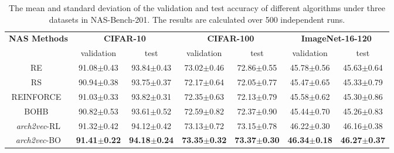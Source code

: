\begin{table}[t]
\begin{adjustbox}{width=\columnwidth,center}
\scriptsize{
\begin{tabular}{|c|c|c|c|c|c|c|}
\hline
\multirow{2}{*}{\textbf{NAS Methods}}  & \multicolumn{2}{c|}{\textbf{CIFAR-10}}                     & \multicolumn{2}{c|}{\textbf{CIFAR-100}}                  & \multicolumn{2}{c|}{\textbf{ImageNet-16-120}}              \\ \cline{2-7} & validation              & test                    & validation             & test                   & validation              & test                    \\ \hline
RE~\cite{real2019regularized}      & 91.08$\pm$0.43          & 93.84$\pm$0.43          & 73.02$\pm$0.46         & 72.86$\pm$0.55         & 45.78$\pm$0.56          & 45.63$\pm$0.64          \\
RS~\cite{bergstra12randsearch}  & 90.94$\pm$0.38          & 93.75$\pm$0.37          & 72.17$\pm$0.64         & 72.05$\pm$0.77         & 45.47$\pm$0.65          & 45.33$\pm$0.79          \\
REINFORCE~\cite{williams92rl}     & 91.03$\pm$0.33          & 93.82$\pm$0.31          & 72.35$\pm$0.63         & 72.13$\pm$0.79         & 45.58$\pm$0.62          & 45.30$\pm$0.86          \\
BOHB~\cite{falkner-icml-18}      & 90.82$\pm$0.53          & 93.61$\pm$0.52          & 72.59$\pm$0.82         & 72.37$\pm$0.90         & 45.44$\pm$0.70          & 45.26$\pm$0.83          \\ \hline
\textit{arch2vec}-RL    & 91.32$\pm$0.42          & 94.12$\pm$0.42          & 73.13$\pm$0.72         & 73.15$\pm$0.78         & 46.22$\pm$0.30 & 46.16$\pm$0.38          \\
\textit{arch2vec}-BO    & \textbf{91.41$\pm$0.22} & \textbf{94.18$\pm$0.24} & \textbf{73.35$\pm$0.32} & \textbf{73.37$\pm$0.30} & \textbf{46.34$\pm$0.18}          & \textbf{46.27$\pm$0.37} \\ \hline
\end{tabular}
}
\end{adjustbox}
\vspace{1mm}
\caption{The mean and standard deviation of the validation and test accuracy of different algorithms under three datasets in NAS-Bench-201. The results are calculated over 500 independent runs.} \vspace{-1mm}
\label{table:NasBench201}
\end{table}

